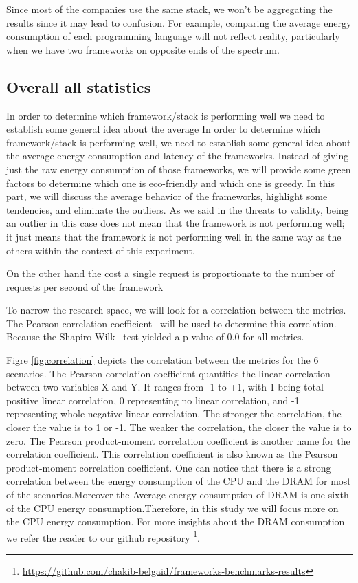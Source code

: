 Since most of the companies use the same stack, we won't be aggregating the results since it may lead to confusion.
For example, comparing the average energy consumption of each programming language will not reflect reality, particularly when we have two frameworks on opposite ends of the spectrum. 

\subsection{Overall all statistics}
In order to determine which framework/stack is performing well we need to establish some general idea about the average In order to determine which framework/stack is performing well, we need to establish some general idea about the average energy consumption and latency of the frameworks. Instead of giving just the raw energy consumption of those frameworks, we will provide some green factors to determine which one is eco-friendly and which one is greedy.
In this part, we will discuss the average behavior of the frameworks, highlight some tendencies, and eliminate the outliers.
As we said in the threats to validity, being an outlier in this case does not mean that the framework is not performing well; it just means that the framework is not performing well in the same way as the others within the context of this experiment.

On the other hand the cost a single request is proportionate to the number of requests per second of the framework 

To narrow the research space, we will look for a correlation between the metrics. The Pearson correlation coefficient~\cite{zar2005spearman} will be used to determine this correlation. Because the Shapiro-Wilk~\cite{shapiro1968comparative} test yielded a p-value of 0.0 for all metrics.

Figre \ref{fig:correlation} depicts the correlation between the metrics for the 6 scenarios. The Pearson correlation coefficient quantifies the linear correlation between two variables X and Y. It ranges from -1 to +1, with 1 being total positive linear correlation, 0 representing no linear correlation, and -1 representing whole negative linear correlation. The stronger the correlation, the closer the value is to 1 or -1. The weaker the correlation, the closer the value is to zero. The Pearson product-moment correlation coefficient is another name for the correlation coefficient. This correlation coefficient is also known as the Pearson product-moment correlation coefficient.
One can notice that there is a strong correlation between the energy consumption of the CPU  and the DRAM for most of the scenarios.Moreover the Average energy consumption of DRAM is one sixth of the CPU energy consumption.Therefore, in this study we will focus more on the CPU energy consumption. 
For more insights about the DRAM consumption we refer the reader to our github repository \footnote{\url{https://github.com/chakib-belgaid/frameworks-benchmarks-results}}. 
 
